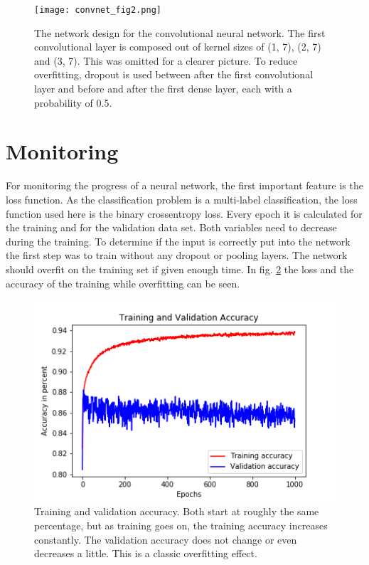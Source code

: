 \begin{figure}
\texttt{[image: convnet\_fig2.png]}
\caption{The network design for the convolutional neural network. The first convolutional layer is composed out of kernel sizes of (1, 7), (2, 7) and (3, 7). This was omitted for a clearer picture. To reduce overfitting, dropout is used between after the first convolutional layer and before and after the first dense layer, each with a probability of 0.5. \protect \footnotemark}
\label{convnet}
\end{figure}

\section{Monitoring}
For monitoring the progress of a neural network, the first important feature is the loss function. As the classification problem is a multi-label classification, the loss function used here is the binary crossentropy loss. Every epoch it is calculated for the training and for the validation data set. Both variables need to decrease during the training. To determine if the input is correctly put into the network the first step was to train without any dropout or pooling layers. The network should overfit on the training set if given enough time. In fig. \ref{overfitacc} the loss and the accuracy of the training while overfitting can be seen.
\begin{figure}
\centering
\includegraphics[scale=0.8]{trainvalacc.png}
\caption{Training and validation accuracy. Both start at roughly the same percentage, but as training goes on, the training accuracy increases constantly. The validation accuracy does not change or even decreases a little. This is a classic overfitting effect.}
\label{overfitacc}
\end{figure}
